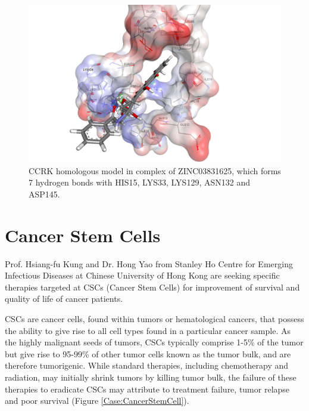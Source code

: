 \begin{figure}
\centering
\includegraphics[width=\linewidth]{Case/1HCL-ZINC03831625.png}
\caption{CCRK homologous model in complex of ZINC03831625, which forms 7 hydrogen bonds with HIS15, LYS33, LYS129, ASN132 and ASP145.}
\label{Case:1HCL-ZINC03831625}
\end{figure}

\section{Cancer Stem Cells}

Prof. Hsiang-fu Kung and Dr. Hong Yao from Stanley Ho Centre for Emerging Infectious Diseases at Chinese University of Hong Kong are seeking specific therapies targeted at CSCs (Cancer Stem Cells) for improvement of survival and quality of life of cancer patients.

CSCs are cancer cells, found within tumors or hematological cancers, that possess the ability to give rise to all cell types found in a particular cancer sample. As the highly malignant seeds of tumors, CSCs typically comprise 1-5\% of the tumor but give rise to 95-99\% of other tumor cells known as the tumor bulk, and are therefore tumorigenic. While standard therapies, including chemotherapy and radiation, may initially shrink tumors by killing tumor bulk, the failure of these therapies to eradicate CSCs may attribute to treatment failure, tumor relapse and poor survival (Figure \ref{Case:CancerStemCell}).

